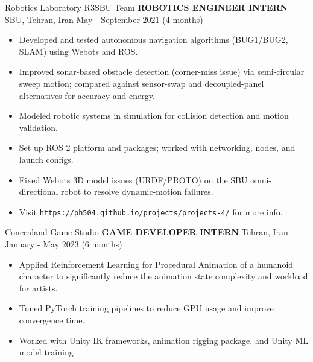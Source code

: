 \begin{cventries}
    \cventry
    {Robotics Laboratory \textemdash R3SBU Team}
    {\textbf{ROBOTICS ENGINEER INTERN}}
    {SBU, Tehran, Iran}
    {May - September 2021 (4 months)}
    {
        \begin{itemize}
            \item Developed and tested autonomous navigation algorithms (BUG1/BUG2, SLAM) using Webots and ROS.
            \item Improved sonar-based obstacle detection (corner-miss issue) via semi-circular sweep motion; compared against sensor-swap and decoupled-panel alternatives for accuracy and energy.
            \item Modeled robotic systems in simulation for collision detection and motion validation.
            \item Set up ROS 2 platform and packages; worked with networking, nodes, and launch configs.
            \item Fixed Webots 3D model issues (URDF/PROTO) on the SBU omni-directional robot to resolve dynamic-motion failures.
            \item Visit \texttt{https://ph504.github.io/projects/projects-4/} for more info.
        \end{itemize}
    }
\end{cventries}
                              
\begin{cventries}
    \cventry
    {Concealand Game Studio}
    {\textbf{GAME DEVELOPER INTERN}}
    {Tehran, Iran}
    {January - May 2023 (6 months)}
    {
        \begin{itemize}    
            \item Applied Reinforcement Learning for Procedural Animation of a humanoid character to significantly reduce the animation state complexity and workload for artists.
            \item Tuned PyTorch training pipelines to reduce GPU usage and improve convergence time.
            \item Worked with Unity IK frameworks, animation rigging package, and Unity ML model training
        \end{itemize}
    }
\end{cventries}

